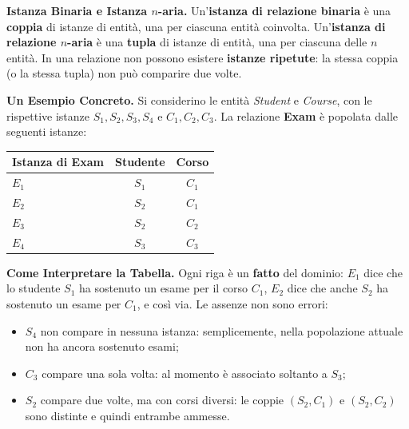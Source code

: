 \documentclass[12pt]{extarticle}
\begin{document}
\noindent \textbf{Istanza Binaria e Istanza $n$-aria.} Un'\textbf{istanza di relazione binaria} è una \textbf{coppia} di istanze di entità, una per ciascuna entità coinvolta. Un'\textbf{istanza di relazione $n$-aria} è una \textbf{tupla} di istanze di entità, una per ciascuna delle $n$ entità. In una relazione non possono esistere \textbf{istanze ripetute}: la stessa coppia (o la stessa tupla) non può comparire due volte.

\medskip
\noindent \textbf{Un Esempio Concreto.} Si considerino le entità \textit{Student} e \textit{Course}, con le rispettive istanze $S_1, S_2, S_3, S_4$ e $C_1, C_2, C_3$. La relazione \textbf{Exam} è popolata dalle seguenti istanze:

\begin{center}
\small
\begin{tabular}{@{}lcc@{}}
    \toprule
    \textbf{Istanza di Exam} & \textbf{Studente} & \textbf{Corso} \\
    \midrule
    $E_1$ & $S_1$ & $C_1$ \\
    $E_2$ & $S_2$ & $C_1$ \\
    $E_3$ & $S_2$ & $C_2$ \\
    $E_4$ & $S_3$ & $C_3$ \\
    \bottomrule
\end{tabular}
\end{center}

\medskip
\noindent \textbf{Come Interpretare la Tabella.} Ogni riga è un \textbf{fatto} del dominio: $E_1$ dice che lo studente $S_1$ ha sostenuto un esame per il corso $C_1$, $E_2$ dice che anche $S_2$ ha sostenuto un esame per $C_1$, e così via. Le assenze non sono errori:
\begin{itemize}
    \item $S_4$ non compare in nessuna istanza: semplicemente, nella popolazione attuale non ha ancora sostenuto esami;
    \item $C_3$ compare una sola volta: al momento è associato soltanto a $S_3$;
    \item $S_2$ compare due volte, ma con corsi diversi: le coppie $(S_2, C_1)$ e $(S_2, C_2)$ sono distinte e quindi entrambe ammesse.
\end{itemize}
\end{document}

